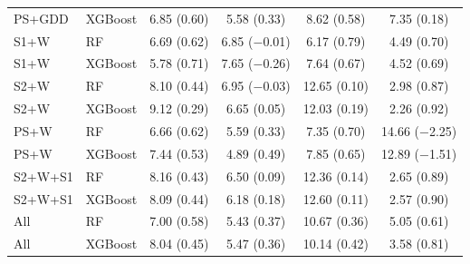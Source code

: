 \begin{table}[htbp]
\begin{tabular}{l l c c c c}
PS+GDD & XGBoost & 6.85 (0.60) & 5.58 (0.33) & 8.62 (0.58) & 7.35 (0.18) \\
S1+W & RF & 6.69 (0.62) & 6.85 ($-$0.01) & 6.17 (0.79) & 4.49 (0.70) \\
S1+W & XGBoost & 5.78 (0.71) & 7.65 ($-$0.26) & 7.64 (0.67) & 4.52 (0.69) \\
S2+W & RF & 8.10 (0.44) & 6.95 ($-$0.03) & 12.65 (0.10) & 2.98 (0.87) \\
S2+W & XGBoost & 9.12 (0.29) & 6.65 (0.05) & 12.03 (0.19) & 2.26 (0.92) \\
PS+W & RF & 6.66 (0.62) & 5.59 (0.33) & 7.35 (0.70) & 14.66 ($-$2.25) \\
PS+W & XGBoost & 7.44 (0.53) & 4.89 (0.49) & 7.85 (0.65) & 12.89 ($-$1.51) \\
S2+W+S1 & RF & 8.16 (0.43) & 6.50 (0.09) & 12.36 (0.14) & 2.65 (0.89) \\
S2+W+S1 & XGBoost & 8.09 (0.44) & 6.18 (0.18) & 12.60 (0.11) & 2.57 (0.90) \\
All & RF & 7.00 (0.58) & 5.43 (0.37) & 10.67 (0.36) & 5.05 (0.61) \\
All & XGBoost & 8.04 (0.45) & 5.47 (0.36) & 10.14 (0.42) & 3.58 (0.81) \\
\bottomrule
\end{tabular}
\end{table}
